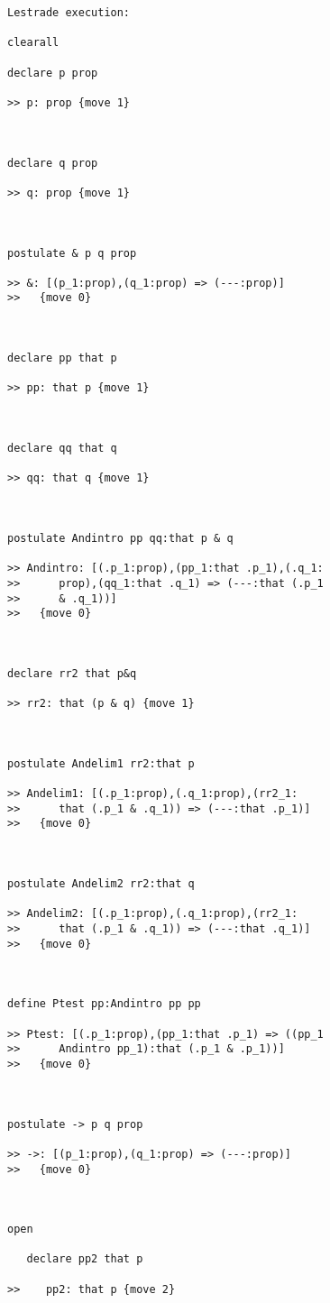 \documentclass[12pt]{article}
\begin{document}
\begin{verbatim}Lestrade execution:

clearall

declare p prop

>> p: prop {move 1}



declare q prop

>> q: prop {move 1}



postulate & p q prop

>> &: [(p_1:prop),(q_1:prop) => (---:prop)]
>>   {move 0}



declare pp that p

>> pp: that p {move 1}



declare qq that q

>> qq: that q {move 1}



postulate Andintro pp qq:that p & q

>> Andintro: [(.p_1:prop),(pp_1:that .p_1),(.q_1:
>>      prop),(qq_1:that .q_1) => (---:that (.p_1
>>      & .q_1))]
>>   {move 0}



declare rr2 that p&q

>> rr2: that (p & q) {move 1}



postulate Andelim1 rr2:that p

>> Andelim1: [(.p_1:prop),(.q_1:prop),(rr2_1:
>>      that (.p_1 & .q_1)) => (---:that .p_1)]
>>   {move 0}



postulate Andelim2 rr2:that q

>> Andelim2: [(.p_1:prop),(.q_1:prop),(rr2_1:
>>      that (.p_1 & .q_1)) => (---:that .q_1)]
>>   {move 0}



define Ptest pp:Andintro pp pp

>> Ptest: [(.p_1:prop),(pp_1:that .p_1) => ((pp_1
>>      Andintro pp_1):that (.p_1 & .p_1))]
>>   {move 0}



postulate -> p q prop

>> ->: [(p_1:prop),(q_1:prop) => (---:prop)]
>>   {move 0}



open

   declare pp2 that p

>>    pp2: that p {move 2}




\end{verbatim}
\end{document}
